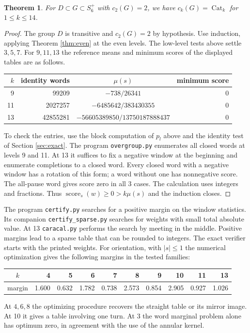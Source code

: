 \documentclass[11pt,a4paper]{amsart}
\newtheorem{theorem}{Theorem}[section]
\newcommand{\Cat}{\operatorname{Cat}}
\newcommand{\score}{\operatorname{score}}
\begin{document}
\begin{theorem}\label{thm:twelve}
For $D\subset G\subset S_6^+$ with $c_2(G)=2$, we have $c_k(G)=\Cat_k$ for $1\leq k\leq14$.
\end{theorem}
\begin{proof}
The group $D$ is transitive and $c_2(G)=2$ by hypothesis. Use induction, applying Theorem \ref{thm:even} at the even levels. The low-level tests above settle $3,5,7$. For $9,11,13$ the reference means and minimum scores of the displayed tables are as follows.
\begin{center}
\begin{tabular}{rrcr}
\toprule
$k$ & identity words & $\mu(s)$ & minimum score\\ \midrule
9 & 99209 & $-738/26341$ & 0\\
11 & 2027257 & $-6485642/383430355$ & 0\\
13 & 42855281 & $-56605389850/13750187888437$ & 0\\ \bottomrule
\end{tabular}
\end{center}
To check the entries, use the block computation of $p_l$ above and the identity test of Section \ref{sec:exact}. The program \texttt{overgroup.py} enumerates all closed words at levels 9 and 11. At 13 it suffices to fix a negative window at the beginning and enumerate completions to a closed word. Every closed word with a negative window has a rotation of this form; a word without one has nonnegative score. The all-pause word gives score zero in all 3 cases. The calculation uses integers and fractions. Thus $\score_s(w)\geq0>k\mu(s)$ and the induction closes.
\end{proof}

The program \texttt{certify.py} searches for a positive margin on the window statistics. Its companion \texttt{certify\_sparse.py} searches for weights with small total absolute value. At 13 \texttt{caracal.py} performs the search by meeting in the middle. Positive margins lead to a sparse table that can be rounded to integers. The exact verifier starts with the printed weights. For orientation, with $|s|\leq1$ the numerical optimization gives the following margins in the tested families:
\begin{center}
\begin{tabular}{c|rrrrrrrrr}
$k$&4&5&6&7&8&9&10&11&13\\ \midrule
margin&1.600&0.632&1.782&0.738&2.573&0.854&2.905&0.927&1.026
\end{tabular}
\end{center}
At $4,6,8$ the optimizing procedure recovers the straight table or its mirror image. At 10 it gives a table involving one turn. At 3 the word marginal problem alone has optimum zero, in agreement with the use of the annular kernel.
\end{document}

